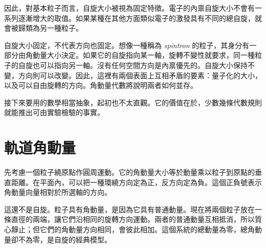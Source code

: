 因此，對基本粒子而言，自旋大小被視為固定特徵。電子的內禀自旋大小不會有一系列逐漸增大的取值。如果某種在其他方面類似電子的激發具有不同的總自旋，就會被歸類為另一種粒子。

自旋大小固定，不代表方向也固定。想像一種稱為 \emph{spintron} 的粒子，其身分有一部分由角動量大小決定。如果它的自旋指向某一軸，旋轉不變性就要求，同一種粒子的自旋也可以指向另一軸。沒有任何空間方向是內禀優先的。自旋大小保持不變，方向則可以改變。因此，這裡有兩個表面上互相矛盾的要素：量子化的大小，以及可以自由旋轉的方向。角動量代數將說明兩者如何並存。

\begin{classroomqa}
\end{classroomqa}

接下來要用的數學相當抽象，起初也不太直觀。它的價值在於，少數幾條代數規則就能推出可由實驗檢驗的事實。

\section{軌道角動量}

先考慮一個粒子繞原點作圓周運動。它的角動量大小等於動量乘以粒子到原點的垂直距離。在平面內，可以把一種環繞方向定為正，反方向定為負。這個正負號表示角動量向量相對於所選軸的方向。

這還不是自旋。粒子具有角動量，是因為它具有普通動量。現在將兩個粒子放在一條直徑的兩端，讓它們沿相同的旋轉方向運動。兩者的普通動量互相抵消，所以質心靜止；但它們的角動量方向相同，會彼此相加。這個系統的總動量為零，總角動量卻不為零，是自旋的經典模型。

